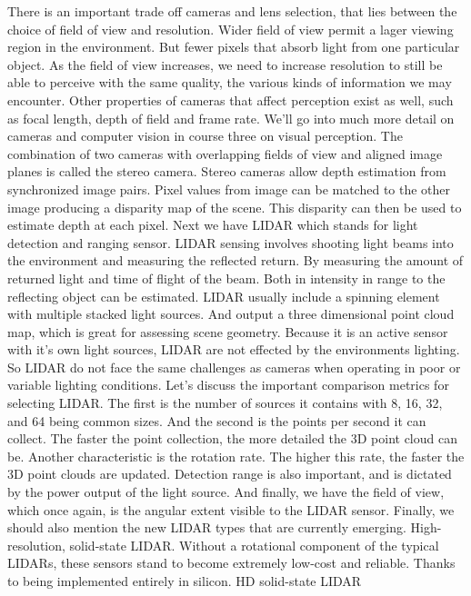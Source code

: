 There is an important trade off
cameras and lens selection, that lies between the choice of
field of view and resolution. Wider field of view permit a lager
viewing region in the environment. But fewer pixels that absorb
light from one particular object. As the field of view increases, we need to increase resolution to still be
able to perceive with the same quality, the various kinds of
information we may encounter. Other properties of cameras that
affect perception exist as well, such as focal length,
depth of field and frame rate. We'll go into much more
detail on cameras and computer vision in course
three on visual perception. The combination of two cameras with
overlapping fields of view and aligned image planes is
called the stereo camera. Stereo cameras allow depth estimation
from synchronized image pairs. Pixel values from image can be
matched to the other image producing a disparity map of the scene. This disparity can then be used
to estimate depth at each pixel. Next we have LIDAR which stands for
light detection and ranging sensor. LIDAR sensing involves shooting
light beams into the environment and measuring the reflected return. By measuring the amount of returned
light and time of flight of the beam. Both in intensity in range to
the reflecting object can be estimated. LIDAR usually include a spinning element
with multiple stacked light sources. And output a three dimensional
point cloud map, which is great for assessing scene geometry. Because it is an active sensor
with it's own light sources, LIDAR are not effected by
the environments lighting. So LIDAR do not face the same challenges
as cameras when operating in poor or variable lighting conditions. Let's discuss the important comparison
metrics for selecting LIDAR. The first is the number of sources
it contains with 8, 16, 32, and 64 being common sizes. And the second is the points
per second it can collect. The faster the point collection, the more
detailed the 3D point cloud can be. Another characteristic
is the rotation rate. The higher this rate, the faster
the 3D point clouds are updated. Detection range is also important, and is dictated by the power
output of the light source. And finally, we have the field of view,
which once again, is the angular extent
visible to the LIDAR sensor. Finally, we should also mention the new
LIDAR types that are currently emerging. High-resolution, solid-state LIDAR. Without a rotational component
of the typical LIDARs, these sensors stand to become
extremely low-cost and reliable. Thanks to being implemented
entirely in silicon. HD solid-state LIDAR
